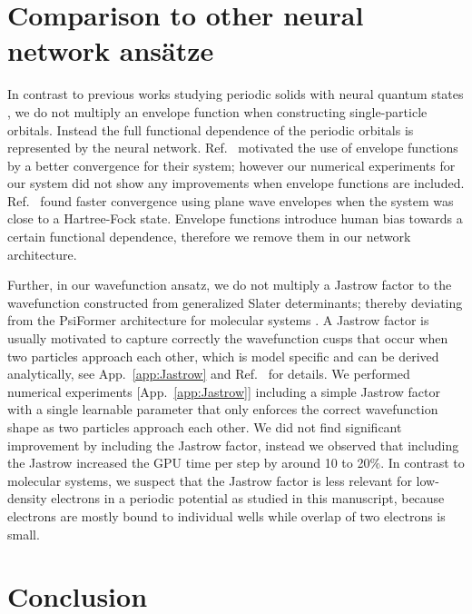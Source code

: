 \documentclass[
 reprint,
 amsmath,amssymb,
 aps, prx,
floatfix,longbibliography,
]{revtex4-2}
\begin{document}
\section{Comparison to other neural network ans\"atze}

In contrast to previous works studying periodic solids with neural quantum states \cite{Cassella2023Jan,Li2022Dec}, we do not multiply an envelope function when constructing single-particle orbitals. Instead the full functional dependence of the periodic orbitals is represented by the neural network. Ref.~\cite{Cassella2023Jan} motivated the use of envelope functions by a better convergence for their system; however our numerical experiments for our system did not show any improvements when envelope functions are included. Ref.~\cite{Li2022Dec} found faster convergence using plane wave envelopes when the system was close to a Hartree-Fock state. Envelope functions introduce human bias towards a certain functional dependence, therefore we remove them in our network architecture. 

Further, in our wavefunction ansatz, we do not multiply a Jastrow factor to the wavefunction constructed from generalized Slater determinants; thereby deviating from the PsiFormer architecture for molecular systems \cite{vonGlehn2022Nov}. A Jastrow factor is usually motivated to capture correctly the wavefunction cusps that occur when two particles approach each other, which is model specific and can be derived analytically, see App.~\ref{app:Jastrow} and Ref.~\cite{Foulkes2001Jan} for details. 
We performed numerical experiments [App.~\ref{app:Jastrow}] including a simple Jastrow factor with a single learnable parameter that only enforces the correct wavefunction shape as two particles approach each other. We did not find significant improvement by including the Jastrow factor, instead we observed that including the Jastrow increased the GPU time per step by around 10 to 20$\%$. 
In contrast to molecular systems, we suspect that the Jastrow factor is less relevant for low-density electrons in a periodic potential as studied in this manuscript, because electrons are mostly bound to individual wells while overlap of two electrons is small. 

\section{Conclusion}
\end{document}
